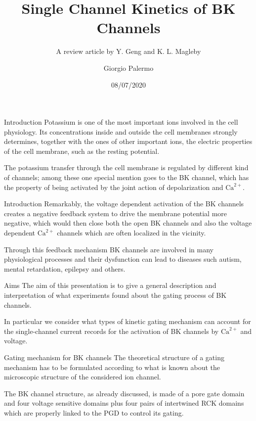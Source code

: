 \documentclass{beamer}
\title{Single Channel Kinetics of BK Channels}
\subtitle{A review article by Y. Geng and K. L. Magleby}
\author{Giorgio Palermo}
\date{08/07/2020}
\institute{LM Physics - a.a. 2019/20 - Biological Physics }
\newcommand{\ca}{\text{Ca}^{2+}}
\begin{document}
\begin{frame}{}
  \titlepage
\end{frame}

\begin{frame}{Introduction}
Potassium is one of the most important ions involved in the cell physiology.
Its concentrations inside and outside the cell membranes strongly determines, together with the ones of other important ions, the electric properties of the cell membrane, such as the resting potential.

The potassium transfer through the cell membrane is regulated by different kind of channels; among these one special mention goes to the BK channel, which has the property of being activated by the joint action of depolarization and $\text{Ca}^{2+}.$

\end{frame}

\begin{frame}{Introduction}
Remarkably, the voltage dependent activation of the BK channels creates a negative feedback system to drive the membrane potential more negative, which would then close both the open BK channels and also the voltage dependent $\ca$ channels which are often localized in the vicinity.

Through this feedback mechanism BK channels are involved in many physiological processes and their dysfunction can lead to diseases such autism, mental retardation, epilepsy and others.
\end{frame}

\begin{frame}{Aims}
The aim of this presentation is to give a general description and interpretation of what experiments found about the gating process of BK channels.

In particular we consider what types of kinetic gating mechanism can account for the single-channel current records for the activation of BK channels by $\ca$ and voltage.

\end{frame}

\begin{frame}{Gating mechanism for BK channels}
The theoretical structure of a gating mechanism has to be formulated according to what is known about the microscopic structure of the considered ion channel.

The BK channel structure, as already discussed, is made of a pore gate domain and four voltage sensitive domains plus four pairs of intertwined RCK domains which are properly linked to the PGD to control its gating.

\end{frame}
\end{document}
